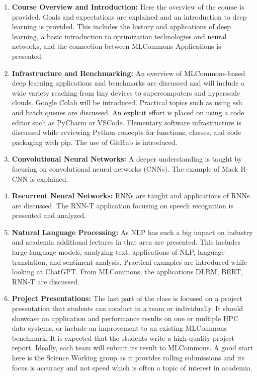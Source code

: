 \documentclass[utf8]{FrontiersinVancouver} %
\begin{document}
\begin{enumerate}
  
\item {\bf Course Overview and Introduction:} Here the overview of the
  course is provided. Goals and expectations are explained and an
  introduction to deep learning is provided. This includes the history
  and applications of deep learning, a basic introduction to
  optimization technologies and neural networks, and the
  connection between MLCommons Applications is presented.

\item {\bf Infrastructure and Benchmarking:} An overview of
  MLCommons-based deep learning applications and benchmarks are
  discussed and will include a wide variety reaching from tiny
  devices to supercomputers and hyperscale clouds. Google Colab will
  be introduced.  Practical topics such as using ssh and batch queues
  are discussed. An explicit effort is placed on using a code editor
  such as PyCharm or VSCode. Elementary software infrastructure is
  discussed while reviewing Python concepts for functions, classes,
  and code packaging with pip. The use of GitHub is introduced.
  
\item{\bf Convolutional Neural Networks:} A deeper understanding is taught
  by focusing on convolutional neural networks (CNNs). The example of
  Mask R-CNN is explained.

\item{\bf Recurrent Neural Networks:} RNNs are taught and applications of
  RNNs are discussed. The RNN-T application focusing on speech
  recognition is presented and analyzed.

\item{\bf Natural Language Processing:} As NLP
  has such a big impact on industry and academia additional lectures
  in that area are presented. This includes large language models,
  analyzing text, applications of NLP, language translation, and
  sentiment analysis.  Practical examples are introduced while looking
  at ChatGPT. From MLCommons, the applications DLRM, BERT, RNN-T are
  discussed.

\item{\bf Project Presentations:} The last part of the class is
  focused on a project presentation that students can conduct in a
  team or individually. It should showcase an application and
  performance results on one or multiple HPC data systems, or include
  an improvement to an existing MLCommons benchmark. It is expected
  that the students write a high-quality project report.
  Ideally, each team will submit its result to MLCommons. A good start here is the Science Working group as it provides rolling submissions and its focus is accuracy and not speed which is often a topic of interest in academia.
  
 \end{enumerate}
\end{document}
